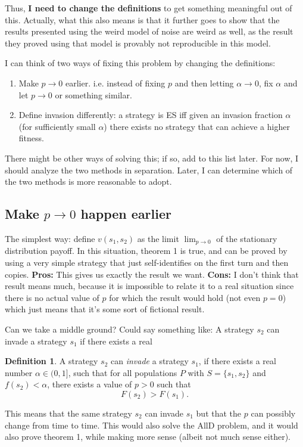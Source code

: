 \documentclass[11pt]{amsart}
\theoremstyle{definition}
\newtheorem{definition}{Definition}
\theoremstyle{remark}
\begin{document}
Thus, \textbf{I need to change the definitions} to get something meaningful out of this. Actually, what this also means is that it further goes to show that the results presented using the weird model of noise are weird as well, as the result they proved using that model is provably not reproducible in this model.

I can think of two ways of fixing this problem by changing the definitions:

\begin{enumerate}
  \item Make $p \to 0$ earlier. i.e. instead of fixing $p$ and then letting $\alpha \to 0$, fix $\alpha$ and let $p \to 0$ or something similar.
  \item Define invasion differently: a strategy is ES iff given an invasion fraction $\alpha$ (for sufficiently small $\alpha$) there exists no strategy that can achieve a higher fitness.
\end{enumerate}

There might be other ways of solving this; if so, add to this list later. For now, I should analyze the two methods in separation. Later, I can determine which of the two methods is more reasonable to adopt.

\subsection*{Make $p \to 0$ happen earlier}

The simplest way: define $v(s_1, s_2)$ as the limit $\lim_{p \to 0}$ of the stationary distribution payoff. In this situation, theorem 1 is true, and can be proved by using a very simple strategy that just self-identifies on the first turn and then copies. \textbf{Pros:} This gives us exactly the result we want. \textbf{Cons:} I don't think that result means much, because it is impossible to relate it to a real situation since there is no actual value of $p$ for which the result would hold (not even $p = 0$) which just means that it's some sort of fictional result.

Can we take a middle ground? Could say something like: A strategy $s_2$ can invade a strategy $s_1$ if there exists a real 
\begin{definition}
  A strategy $s_2$ can \textit{invade} a strategy $s_1$, if there exists a real number $\alpha \in (0,1]$, such that for all populations $P$ with $S = \{s_1, s_2\}$ and $f(s_2) < \alpha$, there exists a value of $p > 0$ such that
  \begin{equation*}
    F(s_2) > F(s_1).
  \end{equation*}
\end{definition}
This means that the same strategy $s_2$ can invade $s_1$ but that the $p$ can possibly change from time to time. This would also solve the AllD problem, and it would also prove theorem 1, while making more sense (albeit not much sense either).
\end{document}
